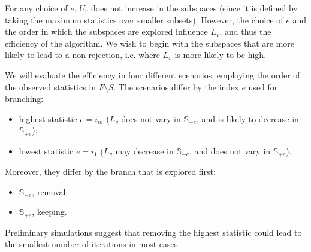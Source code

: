 \documentclass[11pt,a4paper,openright,twoside]{article}
\begin{document}
For any choice of $e$, $U_v$ does not increase in the subspaces (since it is defined by taking the maximum statistics over smaller subsets). However, the choice of $e$ and the order in which the subspaces are explored influence $L_v$, and thus the efficiency of the algorithm. We wish to begin with the subspaces that are more likely to lead to a non-rejection, i.e. where $L_v$ is more likely to be high.

We will evaluate the efficiency in four different scenarios, employing the order of the observed statistics in $F\setminus S$. The scenarios differ by the index $e$ used for branching:
\begin{itemize}
\item highest statistic $e=i_m$ ($L_v$ does not vary in $\mathbb{S}_{-e}$, and is likely to decrease in $\mathbb{S}_{+e}$);
\item lowest statistic $e=i_1$ ($L_v$ may decrease in $\mathbb{S}_{-e}$, and does not vary in $\mathbb{S}_{+e}$).
\end{itemize}
Moreover, they differ by the branch that is explored first:
\begin{itemize}
\item $\mathbb{S}_{-e}$, removal;
\item $\mathbb{S}_{+e}$, keeping.
\end{itemize}
Preliminary simulations suggest that removing the highest statistic could lead to the smallest number of iterations in most cases.
\end{document}
